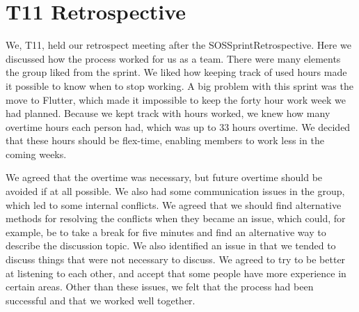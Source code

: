 \section{T11 Retrospective} \label{s1Retrospective}

We, \gls{T11}, held our retrospect meeting after the \gls{SOSSprintRetrospective}. Here we discussed how the process worked for us as a team. There were many elements the group liked from the sprint. We liked how keeping track of used hours made it possible to know when to stop working. A big problem with this sprint was the move to Flutter, which made it impossible to keep the forty hour work week we had planned. Because we kept track with hours worked, we knew how many overtime hours each person had, which was up to 33 hours overtime. We decided that these hours should be flex-time, enabling members to work less in the coming weeks. 

We agreed that the overtime was necessary, but future overtime should be avoided if at all possible. We also had some communication issues in the group, which led to some internal conflicts. We agreed that we should find alternative methods for resolving the conflicts when they became an issue, which could, for example, be to take a break for five minutes and find an alternative way to describe the discussion topic. We also identified an issue in that we tended to discuss things that were not necessary to discuss. We agreed to try to be better at listening to each other, and accept that some people have more experience in certain areas. Other than these issues, we felt that the process had been successful and that we worked well together.